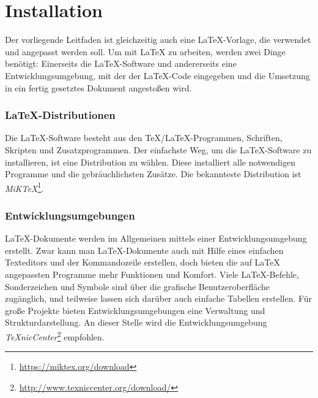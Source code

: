 \section{Installation}
\label{sec:Installation}

Der vorliegende Leitfaden ist gleichzeitig auch eine LaTeX-Vorlage, die verwendet und angepasst werden soll.
Um mit LaTeX zu arbeiten, werden zwei Dinge benötigt:
Einerseits die LaTeX-Software und andererseits eine Entwicklungsumgebung, mit der der LaTeX-Code eingegeben und die Umsetzung in ein fertig gesetztes Dokument angestoßen wird.


\subsubsection*{LaTeX-Distributionen}
Die LaTeX-Software besteht aus den TeX/LaTeX-Programmen, Schriften, Skripten und Zusatzprogrammen.
Der einfachste Weg, um die LaTeX-Software zu installieren, ist eine Distribution zu wählen.
Diese installiert alle notwendigen Programme und die gebräuchlichsten Zusätze.
Die bekannteste Distribution ist \emph{MiKTeX}\footnote{\url{https://miktex.org/download}}.

\subsubsection*{Entwicklungsumgebungen}
LaTeX-Dokumente werden im Allgemeinen mittels einer Entwicklungsumgebung erstellt.
Zwar kann man LaTeX-Dokumente auch mit Hilfe eines einfachen Texteditors und der Kommandozeile erstellen, doch bieten die auf LaTeX angepassten Programme mehr Funktionen und Komfort.
Viele LaTeX-Befehle, Sonderzeichen und Symbole sind über die grafische Benutzeroberfläche zugänglich, und teilweise lassen sich darüber auch einfache Tabellen erstellen.
Für große Projekte bieten Entwicklungsumgebungen eine Verwaltung und Strukturdarstellung.
An dieser Stelle wird die Entwicklungsumgebung \emph{TeXnicCenter}\footnote{\url{http://www.texniccenter.org/download/}} empfohlen.



